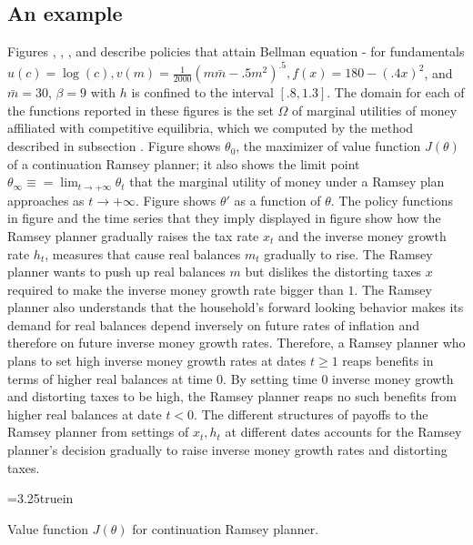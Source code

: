 \subsection{An example}
Figures , ,  , and  describe policies that attain Bellman equation -
for fundamentals    $ u(c) = \log (c),   v(m) = {\frac{1}{2000} }(m \bar m - .5m^2)^{.5}, f(x) =180 - (.4x)^2$, and $\bar m = 30$,
$\beta = 9$ with  $h$ is confined to the interval
 $[.8, 1.3]$. The domain for each of the functions reported in these figures is the set $\Omega$ of marginal utilities of money affiliated with competitive equilibria, which we computed  by the method described in subsection .  Figure  shows  $\theta_0$, the maximizer of  value function $J(\theta)$ of a continuation Ramsey planner; it also shows the limit point $\theta_\infty \equiv = \lim_{t\rightarrow +\infty} \theta_t$
that the marginal utility of money under a Ramsey plan approaches as $t \rightarrow +\infty$. Figure  shows $\theta'$ as a function of $\theta$.
 The policy functions in figure    and the time series that they imply displayed in figure   show how  the  Ramsey planner
gradually raises the tax rate $x_t$ and the inverse   money growth rate $h_t$, measures that cause real balances $m_t$  gradually to rise.
The Ramsey planner wants to push up real balances $m$ but dislikes the distorting taxes $x$ required to make the inverse money growth rate bigger than $1$.
The Ramsey planner also understands that the household's forward looking behavior makes its demand for real balances depend inversely on
 future rates of inflation and therefore on future inverse money growth rates.  Therefore, a Ramsey planner who plans to set  high inverse money growth rates at dates $t \geq 1$
 reaps benefits in terms of higher real balances at time $0$.  By setting time $0$ inverse money growth and distorting taxes to be high, the Ramsey
  planner reaps no such benefits from higher real balances at date $ t < 0$.  The different structures of payoffs to the Ramsey planner from settings
  of $x_t, h_t$ at different dates accounts for the Ramsey planner's decision gradually to raise inverse money growth rates and distorting taxes.



\centerline{\epsfxsize=3.25truein}
\caption{Value function $J(\theta)$ for continuation Ramsey planner.}
\endfigure



